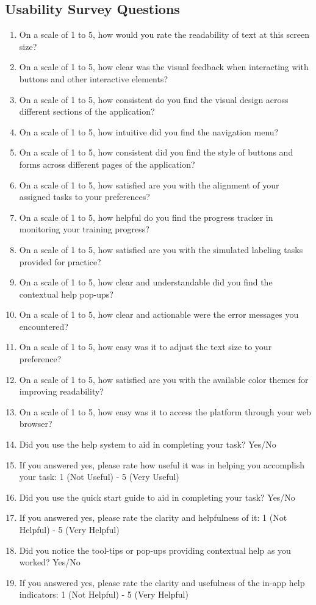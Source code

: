 \documentclass[12pt, titlepage]{article}
\begin{document}
\subsection{Usability Survey Questions}
\begin{enumerate}
    \item On a scale of 1 to 5, how would you rate the readability of text at this screen size? 
    \item On a scale of 1 to 5, how clear was the visual feedback when interacting with buttons and other interactive elements?
    \item On a scale of 1 to 5, how consistent do you find the visual design across different sections of the application?
    \item On a scale of 1 to 5, how intuitive did you find the navigation menu?
    \item On a scale of 1 to 5, how consistent did you find the style of buttons and forms across different pages of the application?
    \item On a scale of 1 to 5, how satisfied are you with the alignment of your assigned tasks to your preferences?
    \item On a scale of 1 to 5, how helpful do you find the progress tracker in monitoring your training progress?
    \item On a scale of 1 to 5, how satisfied are you with the simulated labeling tasks provided for practice?
    \item On a scale of 1 to 5, how clear and understandable did you find the contextual help pop-ups?
    \item On a scale of 1 to 5, how clear and actionable were the error messages you encountered?
    \item On a scale of 1 to 5, how easy was it to adjust the text size to your preference?
    \item On a scale of 1 to 5, how satisfied are you with the available color themes for improving readability?
    \item On a scale of 1 to 5, how easy was it to access the platform through your web browser? 
    \item Did you use the help system to aid in completing your task? Yes/No
    \item If you answered yes, please rate how useful it was in helping you accomplish your task: 1 (Not Useful) - 5 (Very Useful)
    \item Did you use the quick start guide to aid in completing your task? Yes/No
    \item If you answered yes, please rate the clarity and helpfulness of it: 1 (Not Helpful) - 5 (Very Helpful)
    \item Did you notice the tool-tips or pop-ups providing contextual help as you worked? Yes/No
    \item If you answered yes, please rate the clarity and usefulness of the in-app help indicators: 1 (Not Helpful) - 5 (Very Helpful)
\end{enumerate}
\end{document}
